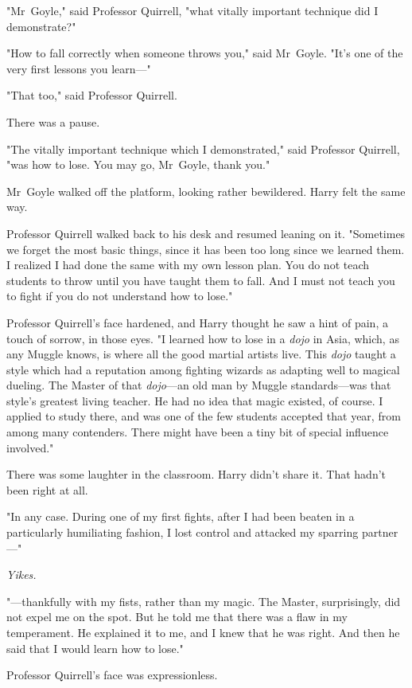 "Mr~Goyle," said Professor Quirrell, "what vitally important technique did I
demonstrate?"

"How to fall correctly when someone throws you," said Mr~Goyle. "It's one of
the very first lessons you learn---"

"That too," said Professor Quirrell.

There was a pause.

"The vitally important technique which I demonstrated," said Professor
Quirrell, "was how to lose. You may go, Mr~Goyle, thank you."

Mr~Goyle walked off the platform, looking rather bewildered. Harry felt the
same way.

Professor Quirrell walked back to his desk and resumed leaning on it.
"Sometimes we forget the most basic things, since it has been too long since we
learned them. I realized I had done the same with my own lesson plan. You do
not teach students to throw until you have taught them to fall. And I must not
teach you to fight if you do not understand how to lose."

Professor Quirrell's face hardened, and Harry thought he saw a hint of pain, a
touch of sorrow, in those eyes. "I learned how to lose in a \emph{dojo} in
Asia, which, as any Muggle knows, is where all the good martial artists live.
This \emph{dojo} taught a style which had a reputation among fighting wizards
as adapting well to magical dueling. The Master of that \emph{dojo}---an old
man by Muggle standards---was that style's greatest living teacher. He had no
idea that magic existed, of course. I applied to study there, and was one of
the few students accepted that year, from among many contenders. There might
have been a tiny bit of special influence involved."

There was some laughter in the classroom. Harry didn't share it. That hadn't
been right at all.

"In any case. During one of my first fights, after I had been beaten in a
particularly humiliating fashion, I lost control and attacked my sparring
partner---"

\emph{Yikes.}

"---thankfully with my fists, rather than my magic. The Master, surprisingly,
did not expel me on the spot. But he told me that there was a flaw in my
temperament. He explained it to me, and I knew that he was right. And then he
said that I would learn how to lose."

Professor Quirrell's face was expressionless.

